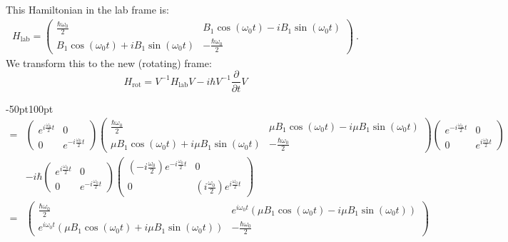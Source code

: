 \documentclass{../lab}
\begin{document}
\begin{enumerate}
\begin{enumerate}
			This Hamiltonian in the lab frame is:
\begin{align*}
	H_\text{lab} = 
	\begin{pmatrix}
		\frac{\hbar\omega_\text{0}}{2} & B_1 \cos(\omega_\text{0} t) - i B_1 \sin(\omega_\text{0} t) \\
		 B_1 \cos(\omega_\text{0} t) + i B_1 \sin(\omega_\text{0} t)& -\frac{\hbar\omega_\text{0}}{2}
	\end{pmatrix}~. 
\end{align*}
We transform this to the new (rotating) frame:
    $$
	H_\text{rot} = V^{-1} H_\text{lab} V - i\hbar V^{-1}\frac{\partial}{\partial t} V$$
	\begin{adjustwidth}{-50pt}{100pt}
	\begin{align*}
	=& \begin{pmatrix}
		e^{i \frac{\omega_\text{0}}{2}t} & 0 \\
		0 & e^{-i \frac{\omega_\text{0}}{2}t}
	\end{pmatrix}
	\begin{pmatrix}
		\frac{\hbar\omega_\text{0}}{2} & \mu B_1 \cos(\omega_\text{0} t) - i \mu B_1 \sin(\omega_\text{0} t) \\
		 \mu B_1 \cos(\omega_\text{0} t) + i \mu B_1 \sin(\omega_\text{0} t)& - \frac{\hbar\omega_\text{0}}{2}
	\end{pmatrix}
	\begin{pmatrix}
		e^{-i \frac{\omega_\text{L}}{2}t} & 0 \\
		0 & e^{i \frac{\omega_\text{0}}{2}t}
	\end{pmatrix} \\
	&- i \hbar
	\begin{pmatrix}
		e^{i \frac{\omega_\text{0}}{2}t} & 0 \\
		0 & e^{-i \frac{\omega_\text{0}}{2}t}
	\end{pmatrix}
	\begin{pmatrix}
		(-i \frac{\omega_\text{0}}{2}) e^{-i \frac{\omega_\text{0}}{2}t} & 0 \\
		0 &(i \frac{\omega_\text{0}}{2}) e^{i \frac{\omega_\text{0}}{2}t}
	\end{pmatrix} \\
	=& 
	\begin{pmatrix}
		\frac{\hbar\omega_\text{0}}{2} & e^{i \omega_\text{0}t} \left(  \mu B_1 \cos(\omega_\text{0} t) - i\mu B_1 \sin(\omega_\text{0} t) \right) \\
		 e^{i \omega_\text{0}t} \left( \mu B_1 \cos(\omega_\text{0} t) + i \mu B_1 \sin(\omega_\text{0} t) \right) & - \frac{\hbar\omega_\text{0}}{2} 

\end{pmatrix}
\end{align*}
\end{adjustwidth}
\end{enumerate}
\end{enumerate}
\end{document}
